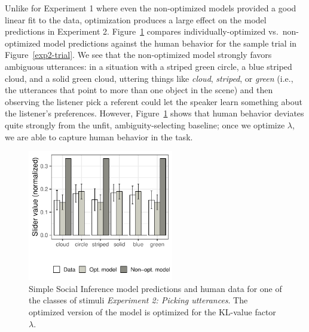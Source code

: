 \documentclass[10pt,a4paper]{article}
\newcommand{\gcs}[1]{\textcolor{blue}{[gcs: #1]}}
\begin{document}
Unlike for Experiment 1 where even the non-optimized models provided a good linear fit to the data, optimization produces a large effect on the model predictions in Experiment 2. Figure~\ref{barplot_x3} compares individually-optimized vs.~non-optimized model predictions against the human behavior for the sample trial in Figure~\ref{exp2-trial}. We see that the non-optimized model strongly favors ambiguous utterances: in a situation with a striped green circle, a blue striped cloud, and a solid green cloud, uttering things like \textit{cloud}, \textit{striped}, or \textit{green} (i.e., the utterances that point to more than one object in the scene) and then observing the listener pick a referent could let the speaker learn something about the listener's preferences. However, Figure~\ref{barplot_x3} shows that human behavior deviates quite strongly from the unfit, ambiguity-selecting baseline; once we optimize $\lambda$, we are able to capture human behavior in the task.

\begin{figure}[ht!]
	\centering
	\includegraphics[width=2.5in]{images/december_barplot_x3.pdf}
	\caption{Simple Social Inference model predictions and human data for one of the classes of stimuli \emph{Experiment 2: Picking utterances}. The optimized version of the model is optimized for the KL-value factor $\lambda$.}\label{barplot_x3}
\end{figure}

\end{document}
